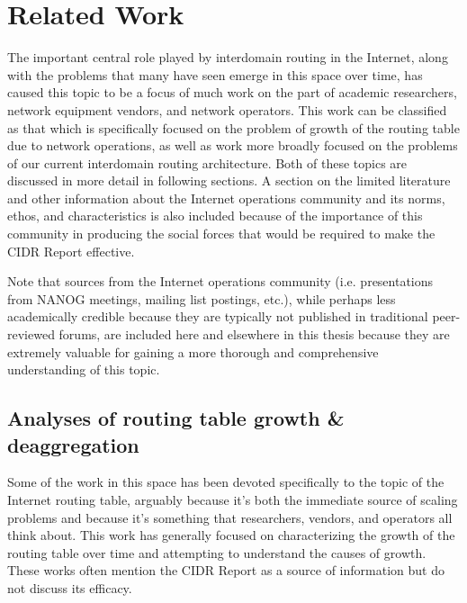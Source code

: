 \chapter{Related Work}
\label{chap:relwork}

The important central role played by interdomain routing in the Internet, along
with the problems that many have seen emerge in this space over time, has
caused this topic to be a focus of much work on the part of academic
researchers, network equipment vendors, and network operators. This work can be
classified as that which is specifically focused on the problem of growth of
the routing table due to network operations, as well as work more broadly
focused on the problems of our current interdomain routing architecture. Both
of these topics are discussed in more detail in following sections. A section
on the limited literature and other information about the Internet operations
community and its norms, ethos, and characteristics is also included because of
the importance of this community in producing the social forces that would be
required to make the CIDR Report effective.

Note that sources from the Internet operations community (i.e. presentations
from NANOG meetings, mailing list postings, etc.), while perhaps less
academically credible because they are typically not published in traditional
peer-reviewed forums, are included here and elsewhere in this thesis because
they are extremely valuable for gaining a more thorough and comprehensive
understanding of this topic.


\section{Analyses of routing table growth \& deaggregation}

Some of the work in this space has been devoted specifically to the topic of
the Internet routing table, arguably because it's both the immediate source of
scaling problems and because it's something that researchers, vendors, and
operators all think about. This work has generally focused on characterizing
the growth of the routing table over time and attempting to understand the
causes of growth. These works often mention the CIDR Report as a source of
information but do not discuss its efficacy.

